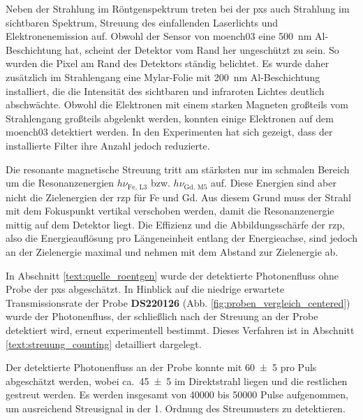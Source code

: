 \noindent
Neben der Strahlung im Röntgenspektrum treten bei der \gls{pxs} auch Strahlung im sichtbaren Spektrum, Streuung des einfallenden Laserlichts und Elektronenemission auf. Obwohl der Sensor von \gls{moench03} eine \SI{500}{\nano\meter} Al-Beschichtung hat, scheint der Detektor vom Rand her ungeschützt zu sein. So wurden die Pixel am Rand des Detektors ständig belichtet. Es wurde daher zusätzlich im Strahlengang eine Mylar-Folie mit \SI{200}{\nano\meter} Al-Beschichtung installiert, die die Intensität des sichtbaren und infraroten Lichtes deutlich abschwächte. Obwohl die Elektronen mit einem starken Magneten großteils vom Strahlengang großteils abgelenkt werden, konnten einige Elektronen auf dem \gls{moench03} detektiert werden. In den Experimenten hat sich gezeigt, dass der installierte Filter ihre Anzahl jedoch reduzierte.
%

\noindent
Die resonante magnetische Streuung tritt am stärksten nur im schmalen Bereich um die Resonanzenergien $h\nu_{\text{Fe, L3}}$ bzw. $h\nu_{\text{Gd, M5}}$ auf. Diese Energien sind aber nicht die Zielenergien der \gls{rzp} für Fe und Gd. Aus diesem Grund muss der Strahl mit dem Fokuspunkt vertikal verschoben werden, damit die Resonanzenergie mittig auf dem Detektor liegt. Die Effizienz und die Abbildungsschärfe der \gls{rzp}, also die Energieauflösung pro Längeneinheit entlang der Energieachse, sind jedoch an der Zielenergie maximal und nehmen mit dem Abstand zur Zielenergie ab.

\noindent
In Abschnitt \ref{text:quelle_roentgen} wurde der detektierte Photonenfluss ohne Probe der \gls{pxs} abgeschätzt. In Hinblick auf die niedrige erwartete Transmissionsrate der Probe \textbf{DS220126} (Abb. \ref{fig:proben_vergleich_centered}) wurde der Photonenfluss, der schließlich nach der Streuung an der Probe detektiert wird, erneut experimentell bestimmt. Dieses Verfahren ist in Abschnitt \ref{text:streuung_counting} detailliert dargelegt.

\noindent
Der detektierte Photonenfluss an der Probe konnte mit \SI{60(5)}{\photons} pro Puls abgeschätzt werden, wobei ca.\ \SI{45(5)}{\photons} im Direktstrahl liegen und die restlichen gestreut werden. Es werden insgesamt von \num{40000} bis \SI{50000}{\captures} Pulse aufgenommen, um ausreichend Streusignal in der 1. Ordnung des Streumusters zu detektieren.


